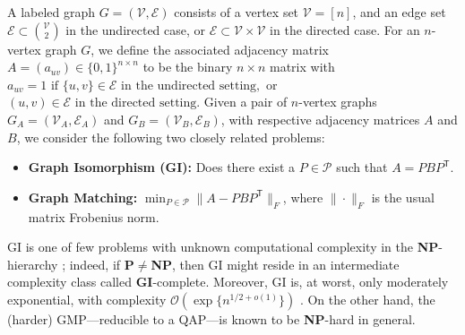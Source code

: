 \documentclass[10pt]{article}
\providecommand{\mc}[1]{\mathcal{#1}}
\providecommand{\mc}[1]{\mathcal{#1}}
\newcommand{\T}{^{\ensuremath{\mathsf{T}}}}
\begin{document}
A labeled graph $G=(\mc{V},\mc{E})$ consists of a vertex set $\mc{V}=[n]$, and an edge set $\mc{E}\subset\binom{\mc{V}}{2}$ in the undirected case, or 
$\mc{E}\subset\mc{V}\times\mc{V}$ in the directed case. %
For an $n$-vertex graph $G$, we define the associated adjacency matrix $A=(a_{uv})\in\{0,1\}^{n\times n}$ to be the binary $n\times n$ matrix with
$a_{uv}= 1 \text{ if }\{u,v\}\in \mc{E}\text{ in the undirected setting},$ or $(u,v)\in \mc{E}\text{ in the directed setting}.$
Given a pair of $n$-vertex graphs $G_A=(\mc{V}_A,\mc{E}_A)$ and $G_B=(\mc{V}_B,\mc{E}_B)$, with respective adjacency matrices $A$ and $B$, 
we consider the following two closely related problems:
\begin{itemize}
	\item \textbf{Graph Isomorphism (GI):}  Does there exist a $P \in \mc{P}$ such that $A=PBP\T$. 
		\item \textbf{Graph Matching:}
		 $\min_{P\in\mc{P}}\|A-PBP\T \|_F$, where $\|\cdot\|_F$ is the usual matrix Frobenius norm.
\end{itemize}
GI is one of few problems with unknown computational complexity in the {\bf NP}-hierarchy \cite{Fortin1996};  indeed, if \textbf{P}$\neq$\textbf{NP}, then GI might reside in an intermediate complexity class called \textbf{GI}-complete.  Moreover, GI is, at worst, only moderately exponential, with complexity $\mc{O}(\exp\{n^{1/2 + o(1)}\})$ \cite{Babai1981}. On the other hand, the (harder) GMP---reducible to a QAP---is known to be \textbf{NP}-hard in general.    
\end{document}
